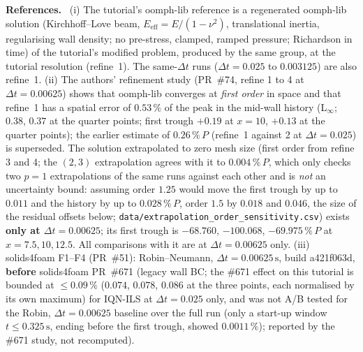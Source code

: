 \documentclass[sn-mathphys,Numbered]{sn-jnl}
\newcommand{\pP}{\ensuremath{\,\%\,P}}
\renewcommand{\paragraph}[1]{\par\vspace{0.15\baselineskip}\noindent\textbf{#1}\ }
\begin{document}
\paragraph{References.}
(i) The tutorial's oomph-lib reference is a regenerated oomph-lib solution (Kirchhoff--Love beam, $E_\mathrm{eff}=E/(1-\nu^2)$, translational inertia, regularising wall density; no pre-stress, clamped, ramped pressure; Richardson in time) of the tutorial's modified problem, produced by the same group, at the tutorial resolution (refine~1). The same-$\Delta t$ runs ($\Delta t=0.025$ to $0.003125$) are also refine~1. (ii) The authors' refinement study (PR~\#74, refine 1 to 4 at $\Delta t=0.00625$) shows that oomph-lib converges at \emph{first order} in space and that refine~1 has a spatial error of $0.53\,\%$ of the peak in the mid-wall history (L$_\infty$; $0.38$, $0.37$ at the quarter points; first trough $+0.19$ at $x=10$, $+0.13$ at the quarter points); the earlier estimate of $0.26\,\%\,P$ (refine~1 against 2 at $\Delta t=0.025$) is superseded. The solution extrapolated to zero mesh size (first order from refine 3 and 4; the $(2,3)$ extrapolation agrees with it to $0.004\,\%\,P$, which only checks two $p=1$ extrapolations of the same runs against each other and is \emph{not} an uncertainty bound: assuming order $1.25$ would move the first trough by up to $0.011$ and the history by up to $0.028\,\%\,P$, order $1.5$ by $0.018$ and $0.046$, the size of the residual offsets below; \texttt{data/extrapolation\_order\_sensitivity.csv}) exists \textbf{only at $\Delta t=0.00625$}; its first trough is $-68.760$, $-100.068$, $-69.975\pP$ at $x=7.5,10,12.5$. All comparisons with it are at $\Delta t=0.00625$ only. (iii) solids4foam F1--F4 (PR~\#51): Robin--Neumann, $\Delta t=0.00625\,\mathrm s$, build a421f063d, \textbf{before} solids4foam PR~\#671 (legacy wall BC; the \#671 effect on this tutorial is bounded at $\le0.09\,\%$ ($0.074$, $0.078$, $0.086$ at the three points, each normalised by its own maximum) for IQN-ILS at $\Delta t=0.025$ only, and was not A/B tested for the Robin, $\Delta t=0.00625$ baseline over the full run (only a start-up window $t\le0.325\,\mathrm s$, ending before the first trough, showed $0.0011\,\%$); reported by the \#671 study, not recomputed).
\end{document}

